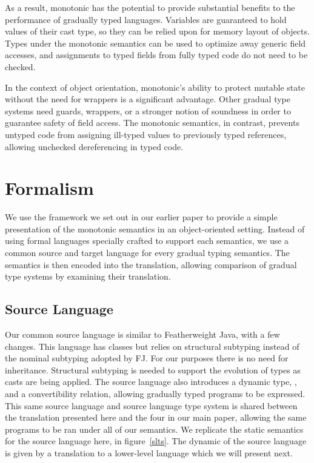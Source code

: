 \documentclass[sigconf]{acmart}
\begin{document}
As a result, monotonic has the potential to provide substantial benefits to
the performance of gradually typed languages. Variables are guaranteed to
hold values of their cast type, so they can be relied upon for memory layout
of objects. Types under the monotonic semantics can be used to optimize away
generic field accesses, and assignments to typed fields from fully typed
code do not need to be checked.

In the context of object orientation, monotonic's ability to protect mutable
state without the need for wrappers is a significant advantage. Other
gradual type systems need guards, wrappers, or a stronger notion of
soundness in order to guarantee safety of field access. The monotonic
semantics, in contrast, prevents untyped code from assigning ill-typed
values to previously typed references, allowing unchecked dereferencing in
typed code.

\section{Formalism}

We use the framework we set out in our earlier paper to provide a simple
presentation of the monotonic semantics in an object-oriented setting. Instead
of using formal languages specially crafted to support each semantics, we use
a common source and target language for every gradual typing semantics. The 
semantics is then encoded into the translation, allowing comparison of gradual 
type systems by examining their translation.

\subsection{Source Language}

Our common source language is similar to Featherweight Java, with a few
changes. This language has classes but relies on structural subtyping
instead of the nominal subtyping adopted by FJ. For our purposes there is no
need for inheritance. Structural subtyping is needed to support the
evolution of types as casts are being applied. The source language also
introduces a dynamic type, \any, and a convertibility relation, allowing
gradually typed programs to be expressed. This same source language and
source language type system is shared between the translation presented here
and the four in our main paper, allowing the same programs to be ran under
all of our semantics. We replicate the static semantics for the source
language here, in figure~\ref{slts}. The dynamic of the source language is
given by a translation to a lower-level language which we will present next.
\end{document}
